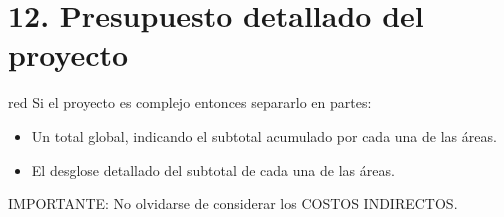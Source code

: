 \documentclass[
11pt, %
]{charter}
\begin{document}
\section{12. Presupuesto detallado del proyecto}
\label{sec:presupuesto}

\begin{consigna}{red}
Si el proyecto es complejo entonces separarlo en partes:
\begin{itemize}
	\item Un total global, indicando el subtotal acumulado por cada una de las áreas.
	\item El desglose detallado del subtotal de cada una de las áreas.
\end{itemize}

IMPORTANTE: No olvidarse de considerar los COSTOS INDIRECTOS.

\end{consigna}
\end{document}
